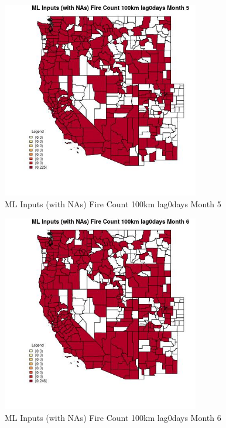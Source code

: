 \begin{figure} 
\centering  
\includegraphics[width=0.77\textwidth]{Code_Outputs/Report_ML_input_PM25_Step4_part_e_de_duplicated_aves_compiled_2019-05-21wNAs_CountyFire_Count_100km_lag0daysmedianMonth5.jpg} 
\caption{\label{fig:Report_ML_input_PM25_Step4_part_e_de_duplicated_aves_compiled_2019-05-21wNAsCountyFire_Count_100km_lag0daysmedianMonth5}ML Inputs (with NAs) Fire Count 100km lag0days Month 5} 
\end{figure} 
 

\begin{figure} 
\centering  
\includegraphics[width=0.77\textwidth]{Code_Outputs/Report_ML_input_PM25_Step4_part_e_de_duplicated_aves_compiled_2019-05-21wNAs_CountyFire_Count_100km_lag0daysmedianMonth6.jpg} 
\caption{\label{fig:Report_ML_input_PM25_Step4_part_e_de_duplicated_aves_compiled_2019-05-21wNAsCountyFire_Count_100km_lag0daysmedianMonth6}ML Inputs (with NAs) Fire Count 100km lag0days Month 6} 
\end{figure} 
 

